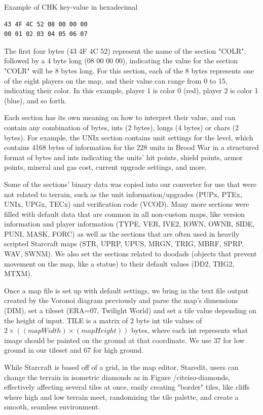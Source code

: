 \documentclass[letterpaper]{article}
\begin{document}
Example of CHK key-value in hexadecimal
\begin{verbatim}
43 4F 4C 52 08 00 00 00
00 01 02 03 04 05 06 07
\end{verbatim}

The first four bytes (43 4F 4C 52) represent the name of the section "COLR", followed by a 4 byte long (08 00 00 00), indicating the value for the section "COLR" will be 8 bytes long. For this section, each of the 8 bytes represents one of the eight players on the map, and their value can range from 0 to 15, indicating their color. In this example, player 1 is color 0 (red), player 2 is color 1 (blue), and so forth.

Each section has its own meaning on how to interpret their value, and can contain any combination of bytes, ints (2 bytes), longs (4 bytes) or chars (2 bytes). For example, the UNIx section contains unit settings for the level, which contains 4168 bytes of information for the 228 units in Brood War in a structured format of bytes and ints indicating the units' hit points, shield points, armor points, mineral and gas cost, current upgrade settings, and more.

Some of the sections' binary data was copied into our converter for use that were not related to terrain, such as the unit information/upgrades (PUPx, PTEx, UNIx, UPGx, TECx) and verification code (VCOD). Many more sections were filled with default data that are common in all non-custom maps, like version information and player information (TYPE, VER, IVE2, IOWN, OWNR, SIDE, PUNI, MASK, FORC) as well as the sections that are often used in heavily scripted Starcraft maps (STR, UPRP, UPUS, MRGN, TRIG, MBRF, SPRP, WAV, SWNM). We also set the sections related to doodads (objects that prevent movement on the map, like a statue) to their default values (DD2, THG2, MTXM).

Once a map file is set up with default settings, we bring in the text file output created by the Voronoi diagram previously and parse the map's dimensions (DIM), set a tileset (ERA=07, Twilight World) and set a tile value depending on the height of input. TILE is a matrix of 2 byte int tile values of $2 \times ((mapWidth)  \times (mapHeight))$ bytes, where each int represents what image should be painted on the ground at that coordinate. We use $37$ for low ground in our tileset and $67$ for high ground.

While Starcraft is based off of a grid, in the map editor, Staredit, users can change the terrain in isometric diamonds as in Figure /cite{iso-diamonds}, effectively affecting several tiles at once, easily creating "border" tiles, like cliffs where high and low terrain meet, randomizing the tile palette, and create a smooth, seamless environment.
\end{document}
